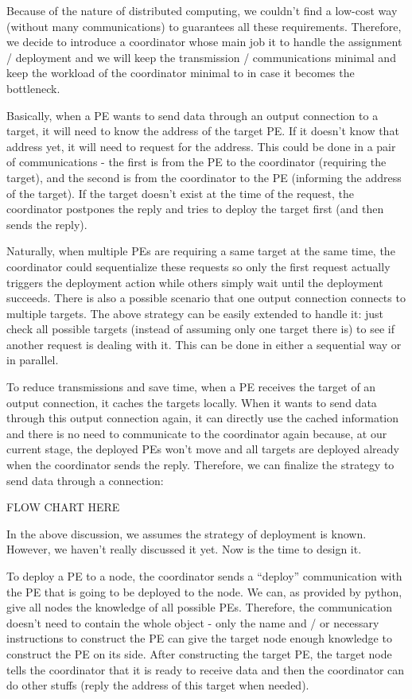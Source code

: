 Because of the nature of distributed computing, we couldn't find a low-cost way (\ie without many communications) to guarantees all these requirements. Therefore, we decide to introduce a coordinator whose main job it to handle the assignment / deployment and we will keep the transmission / communications minimal and keep the workload of the coordinator minimal to in case it becomes the bottleneck.

Basically, when a PE wants to send data through an output connection to a target, it will need to know the address of the target PE. If it doesn't know that address yet, it will need to request for the address. This could be done in a pair of communications - the first is from the PE to the coordinator (requiring the target), and the second is from the coordinator to the PE (informing the address of the target). If the target doesn't exist at the time of the request, the coordinator postpones the reply and tries to deploy the target first (and then sends the reply).

Naturally, when multiple PEs are requiring a same target at the same time, the coordinator could sequentialize these requests so only the first request actually triggers the deployment action while others simply wait until the deployment succeeds. There is also a possible scenario that one output connection connects to multiple targets. The above strategy can be easily extended to handle it: just check all possible targets (instead of assuming only one target there is) to see if another request is dealing with it. This can be done in either a sequential way or in parallel.

To reduce transmissions and save time, when a PE receives the target of an output connection, it caches the targets locally. When it wants to send data through this output connection again, it can directly use the cached information and there is no need to communicate to the coordinator again because, at our current stage, the deployed PEs won't move and all targets are deployed already when the coordinator sends the reply. Therefore, we can finalize the strategy to send data through a connection:

FLOW CHART HERE

In the above discussion, we assumes the strategy of deployment is known. However, we haven't really discussed it yet. Now is the time to design it.

To deploy a PE to a node, the coordinator sends a ``deploy'' communication with the PE that is going to be deployed to the node. We can, as provided by python, give all nodes the knowledge of all possible PEs. Therefore, the communication doesn't need to contain the whole object - only the name and / or necessary instructions to construct the PE can give the target node enough knowledge to construct the PE on its side. After constructing the target PE, the target node tells the coordinator that it is ready to receive data and then the coordinator can do other stuffs (\eg reply the address of this target when needed).

